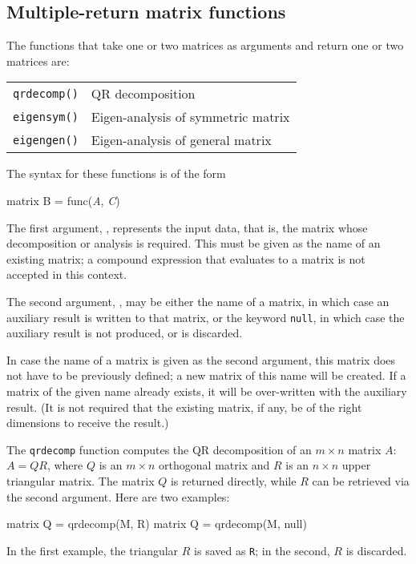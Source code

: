 \subsection{Multiple-return matrix functions}
\label{matrix-multiples}

The functions that take one or two matrices as arguments and return
one or two matrices are:

\begin{center}
\begin{tabular}{ll}
\texttt{qrdecomp()} & QR decomposition \\
\texttt{eigensym()} & Eigen-analysis of symmetric matrix \\
\texttt{eigengen()} & Eigen-analysis of general matrix 
\end{tabular}
\end{center}

The syntax for these functions is of the form
%
\begin{textcode}
matrix B = func(\textsl{A}, \textsl{C})
\end{textcode}
%
The first argument, , represents the input data, that is, the
matrix whose decomposition or analysis is required.  This must be
given as the name of an existing matrix; a compound expression that
evaluates to a matrix is not accepted in this context.

The second argument, , may be either the name of a matrix, in
which case an auxiliary result is written to that matrix, or the
keyword \texttt{null}, in which case the auxiliary result is not
produced, or is discarded.

In case the name of a matrix is given as the second argument, this
matrix does not have to be previously defined; a new matrix of this
name will be created.  If a matrix of the given name already exists,
it will be over-written with the auxiliary result.  (It is not
required that the existing matrix, if any, be of the right dimensions
to receive the result.)

The \texttt{qrdecomp} function computes the QR decomposition of an $m
\times n$ matrix $A$: $A = QR$, where $Q$ is an $m \times n$
orthogonal matrix and $R$ is an $n \times n$ upper triangular matrix.
The matrix $Q$ is returned directly, while $R$ can be retrieved via
the second argument.  Here are two examples:
%
\begin{code}
matrix Q = qrdecomp(M, R)
matrix Q = qrdecomp(M, null)
\end{code}
%
In the first example, the triangular $R$ is saved as \texttt{R}; in
the second, $R$ is discarded.

